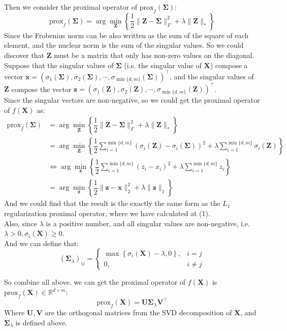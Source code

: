 Then we consider the proximal operator of $\text{prox}_{f}(\mathbf{\Sigma})$:
$$\text{prox}_{f}(\mathbf{\Sigma}) = \arg\min\limits_{\mathbf{Z}}\left\{\dfrac{1}{2}\|\mathbf{Z}-\mathbf{\Sigma}\|_F^2+\lambda\|\mathbf{Z}\|_*\right\}$$
Since the Frobenius norm can be also written as the sum of the square of each element, and the nuclear norm is the sum of the singular values. So we could discover that $\mathbf{Z}$ must be a matrix that only has non-zero values on the diagonal.\\
Suppose that the singular values of $\mathbf{\Sigma}$ (i.e. the singular value of $\mathbf{X}$) compose a vector $\mathbf{x}=(\sigma_1(\mathbf{\Sigma}),\sigma_2(\mathbf{\Sigma}),\cdots,\sigma_{\min\{d,m\}}(\mathbf{\Sigma}))^{\top}$, and the singular values of $\mathbf{Z}$ compose the vector $\mathbf{z}=(\sigma_1(\mathbf{Z}),\sigma_2(\mathbf{Z}),\cdots,\sigma_{\min\{d,m\}}(\mathbf{Z}))^{\top}$.\\
Since the singular vectors are non-negative, so we could get the proximal operator of $f(\mathbf{X})$ as:
\begin{align*}
    \text{prox}_{f}(\mathbf{\Sigma}) &= \arg\min\limits_{\mathbf{Z}}\left\{\dfrac{1}{2}\|\mathbf{Z}-\mathbf{\Sigma}\|_F^2+\lambda\|\mathbf{Z}\|_*\right\} \\
    &= \arg\min\limits_{\mathbf{Z}}\left\{\dfrac{1}{2}\sum\limits_{i=1}^{\min\{d,m\}}(\sigma_i(\mathbf{Z})-\sigma_i(\mathbf{\Sigma}))^2+\lambda\sum\limits_{i=1}^{\min\{d,m\}}\sigma_i(\mathbf{Z})\right\} \\
    &\Leftrightarrow \arg\min\limits_{\mathbf{z}} \left\{\dfrac{1}{2}\sum\limits_{i=1}^{\min\{d,m\}}(z_i-x_i)^2+\lambda\sum\limits_{i=1}^{\min\{d,m\}}z_i\right\} \\
    &= \arg\min\limits_{\mathbf{z}} \left\{\dfrac{1}{2}\|\mathbf{z}-\mathbf{x}\|_2^2+\lambda\|\mathbf{z}\|_1\right\}
\end{align*}
And we could find that the result is the exactly the same form as the $L_1$ regularization proximal operator, where we have calculated at (1). \\
Also, since $\lambda$ is a positive number, and all singular values are non-negative, i.e. $\lambda>0, \sigma_i(\mathbf{X})\geq 0$.\\
And we can define that:
$$(\mathbf{\Sigma}_{\lambda})_{ij} = \begin{cases}
\max\left\{\sigma_i(\mathbf{X})-\lambda, 0\right\}, & i = j \\
0, & i \neq j
\end{cases}$$

So combine all above, we can get the proximal operator of $f(\mathbf{X})$ is $\text{prox}_{f}(\mathbf{X})\in\mathbb{R}^{d\times m}$:
$$\text{prox}_{f}(\mathbf{X})=\mathbf{U}\mathbf{\Sigma}_{\lambda}\mathbf{V}^{\top}$$
Where $\mathbf{U},\mathbf{V}$ are the orthogonal matrices from the SVD decomposition of $\mathbf{X}$, and $\mathbf{\Sigma}_{\lambda}$ is defined above.

\newpage